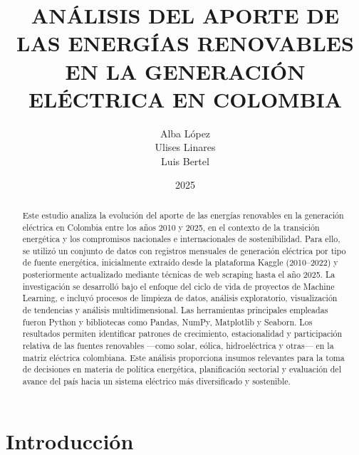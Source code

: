 \documentclass{article}
\begin{document}
	\title{AN\'ALISIS DEL APORTE DE LAS ENERG\'IAS RENOVABLES EN LA GENERACI\'ON EL\'ECTRICA EN COLOMBIA \\		
		{\small {}
			}}
		\author{Alba L\'opez \\ Ulises Linares \\ Luis Bertel}
	\date{2025}
\maketitle
\tableofcontents

\newpage

\begin{abstract}
	Este estudio analiza la evolución del aporte de las energías renovables en la generación eléctrica en Colombia entre los años 2010 y 2025, en el contexto de la transición energética y los compromisos nacionales e internacionales de sostenibilidad. Para ello, se utilizó un conjunto de datos con registros mensuales de generación eléctrica por tipo de fuente energética, inicialmente extraído desde la plataforma Kaggle (2010–2022) y posteriormente actualizado mediante técnicas de web scraping hasta el año 2025. La investigación se desarrolló bajo el enfoque del ciclo de vida de proyectos de Machine Learning, e incluyó procesos de limpieza de datos, análisis exploratorio, visualización de tendencias y análisis multidimensional. Las herramientas principales empleadas fueron Python y bibliotecas como Pandas, NumPy, Matplotlib y Seaborn. Los resultados permiten identificar patrones de crecimiento, estacionalidad y participación relativa de las fuentes renovables —como solar, eólica, hidroeléctrica y otras— en la matriz eléctrica colombiana. Este análisis proporciona insumos relevantes para la toma de decisiones en materia de política energética, planificación sectorial y evaluación del avance del país hacia un sistema eléctrico más diversificado y sostenible.
\end{abstract}

\section{Introducci\'on}
\end{document}
